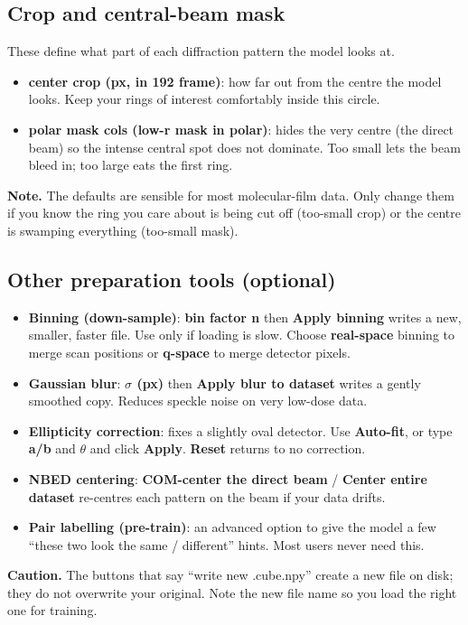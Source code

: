 \documentclass[11pt]{article}
\newcommand{\btn}[1]{\textbf{#1}}
\newcommand{\note}[1]{\par\smallskip\noindent\colorbox{soft}{\parbox{\dimexpr\linewidth-2\fboxsep}{\textbf{Note.} #1}}\par\smallskip}
\newcommand{\caution}[1]{\par\smallskip\noindent\colorbox{warn}{\parbox{\dimexpr\linewidth-2\fboxsep}{\textbf{Caution.} #1}}\par\smallskip}
\begin{document}
\subsection{Crop and central-beam mask}
These define what part of each diffraction pattern the model looks at.
\begin{itemize}[itemsep=2pt]
\item \textbf{center crop (px, in 192 frame)}: how far out from the centre the
model looks. Keep your rings of interest comfortably inside this circle.
\item \textbf{polar mask cols (low-r mask in polar)}: hides the very centre (the
direct beam) so the intense central spot does not dominate. Too small lets the beam
bleed in; too large eats the first ring.
\end{itemize}
\note{The defaults are sensible for most molecular-film data. Only change them if
you know the ring you care about is being cut off (too-small crop) or the centre is
swamping everything (too-small mask).}

\subsection{Other preparation tools (optional)}
\begin{itemize}[itemsep=3pt]
\item \textbf{Binning (down-sample)}: \textbf{bin factor n} then
\btn{Apply binning} writes a new, smaller, faster file. Use only if loading is slow.
Choose \textbf{real-space} binning to merge scan positions or \textbf{q-space} to
merge detector pixels.
\item \textbf{Gaussian blur}: \textbf{$\sigma$ (px)} then \btn{Apply blur to
dataset} writes a gently smoothed copy. Reduces speckle noise on very low-dose data.
\item \textbf{Ellipticity correction}: fixes a slightly oval detector. Use
\btn{Auto-fit}, or type \textbf{a/b} and \textbf{$\theta$} and click \btn{Apply}.
\btn{Reset} returns to no correction.
\item \textbf{NBED centering}: \btn{COM-center the direct beam} /
\btn{Center entire dataset} re-centres each pattern on the beam if your data drifts.
\item \textbf{Pair labelling (pre-train)}: an advanced option to give the model a
few ``these two look the same / different'' hints. Most users never need this.
\end{itemize}
\caution{The buttons that say ``write new .cube.npy'' create a new file on disk;
they do not overwrite your original. Note the new file name so you load the right
one for training.}
\end{document}
